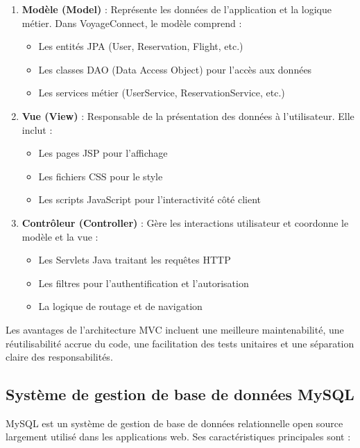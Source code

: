 \documentclass[12pt,a4paper]{report}
\begin{document}
\begin{enumerate}
    \item \textbf{Modèle (Model)} : Représente les données de l'application et la logique métier. Dans VoyageConnect, le modèle comprend :
    \begin{itemize}
        \item Les entités JPA (User, Reservation, Flight, etc.)
        \item Les classes DAO (Data Access Object) pour l'accès aux données
        \item Les services métier (UserService, ReservationService, etc.)
    \end{itemize}
    
    \item \textbf{Vue (View)} : Responsable de la présentation des données à l'utilisateur. Elle inclut :
    \begin{itemize}
        \item Les pages JSP pour l'affichage
        \item Les fichiers CSS pour le style
        \item Les scripts JavaScript pour l'interactivité côté client
    \end{itemize}
    
    \item \textbf{Contrôleur (Controller)} : Gère les interactions utilisateur et coordonne le modèle et la vue :
    \begin{itemize}
        \item Les Servlets Java traitant les requêtes HTTP
        \item Les filtres pour l'authentification et l'autorisation
        \item La logique de routage et de navigation
    \end{itemize}
\end{enumerate}

Les avantages de l'architecture MVC incluent une meilleure maintenabilité, une réutilisabilité accrue du code, une facilitation des tests unitaires et une séparation claire des responsabilités.

\subsection{Système de gestion de base de données MySQL}

MySQL est un système de gestion de base de données relationnelle open source largement utilisé dans les applications web. Ses caractéristiques principales sont :
\end{document}
